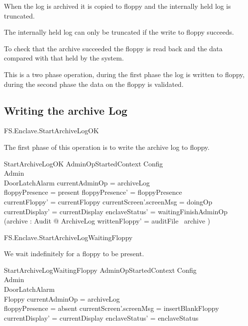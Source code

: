 When the log is archived it is copied to floppy and the internally
held log is truncated.

The internally held log can only be truncated if the write to floppy
succeeds.  

To check that the archive succeeded the floppy is read back and the
data compared with that held by the system.

This is a two phase operation, during the first phase the log is
written to floppy, during the second phase the data on the floppy is
validated. 


\subsection{Writing the archive Log}

\begin{traceunit}{FS.Enclave.StartArchiveLogOK}
\end{traceunit}


The first phase of this operation is to write the archive log to
floppy.

\begin{schema}{StartArchiveLogOK}
        AdminOpStartedContext
\also   
        \Xi Config
\\      \Xi Admin 
\\      \Xi DoorLatchAlarm    
\where
        \The currentAdminOp = archiveLog
\\      floppyPresence = present
\also
        floppyPresence' = floppyPresence
\\      currentFloppy' = currentFloppy
\also
        currentScreen'.screenMsg = doingOp
\\      currentDisplay' = currentDisplay
\also
        enclaveStatus' = waitingFinishAdminOp
\\      (\exists archive : \finset Audit @ ArchiveLog \land
writtenFloppy' = auditFile~ archive )
\end{schema}

\begin{traceunit}{FS.Enclave.StartArchiveLogWaitingFloppy}
\end{traceunit}


We wait indefinitely for a floppy to be present.

\begin{schema}{StartArchiveLogWaitingFloppy}
        AdminOpStartedContext
\also   
        \Xi Config
\\      \Xi Admin 
\\      \Xi DoorLatchAlarm    
\\      \Xi Floppy
\where
        \The currentAdminOp = archiveLog
\\      floppyPresence = absent
\also
        currentScreen'.screenMsg = insertBlankFloppy
\\      currentDisplay' = currentDisplay
\also
        enclaveStatus' = enclaveStatus
\end{schema}


